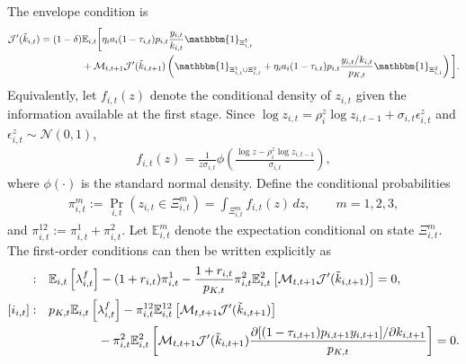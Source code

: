 \documentclass[12pt]{article}
\numberwithin{equation}{section}
\begin{document}
The envelope condition is
\begin{align*}
    \mathcal{J}'(\tilde{k}_{i,t}) = (1-\delta) &\mathbb{E}_{i,t}\bigg[\eta_i a_i (1-\tau_{i,t})p_{i,t}\frac{y_{i,t}}{k_{i,t}}\mathbbm{1}_{\Xi^1_{i,t}} \\
    &+ \mathcal{M}_{t,t+1} \mathcal{J}'(\tilde{k}_{i, t+1})\left(\mathbbm{1}_{\Xi^1_{i,t} \cup \Xi^2_{i,t}} + \eta_i a_i(1-\tau_{i,t})p_{i,t}\frac{y_{i,t}/k_{i,t}}{p_{K,t}}\mathbbm{1}_{\Xi^2_{i,t}}\right)\bigg].
\end{align*}
Equivalently, let $f_{i,t}(z)$ denote the conditional density of $z_{i,t}$ given the information available at the first stage. Since $\log z_{i,t}=\rho_i^z\log z_{i,t-1}+\sigma_{i,t}\epsilon^z_{i,t}$ and $\epsilon^z_{i,t}\sim\mathcal N(0,1)$,
\begin{align*}
    f_{i,t}(z)
    =
    \frac{1}{z\sigma_{i,t}}
    \phi\left(
        \frac{\log z-\rho_i^z\log z_{i,t-1}}{\sigma_{i,t}}
    \right),
\end{align*}
where $\phi(\cdot)$ is the standard normal density. Define the conditional probabilities
\begin{align*}
    \pi^m_{i,t}
    :=
    \Pr_{i,t}\left(z_{i,t}\in\Xi^m_{i,t}\right)
    =
    \int_{\Xi^m_{i,t}} f_{i,t}(z)\,dz,
    \qquad
    m=1,2,3,
\end{align*}
and $\pi^{12}_{i,t}:=\pi^1_{i,t}+\pi^2_{i,t}$. Let $\mathbb{E}^m_{i,t}$ denote the expectation conditional on state $\Xi^m_{i,t}$. The first-order conditions can then be written explicitly as
\begin{align}
    [b^f_{i,t}]: \quad
    &\mathbb{E}_{i,t}\left[\lambda^f_{i,t}\right]
    -
    (1+r_{i,t})\pi^1_{i,t}
    -
    \frac{1+r_{i,t}}{p_{K,t}}
    \pi^2_{i,t}
    \mathbb{E}^{2}_{i,t}\left[
        \mathcal M_{t,t+1}
        \mathcal{J}'(\tilde{k}_{i,t+1})
    \right]
    =
    0, \label{eq:first_stage_foc_b}
    \\
    [i_{i,t}]: \quad
    &p_{K,t}\mathbb{E}_{i,t}\left[\lambda^f_{i,t}\right]
    -
    \pi^{12}_{i,t}
    \mathbb{E}^{12}_{i,t}\left[
        \mathcal M_{t,t+1}
        \mathcal{J}'(\tilde{k}_{i,t+1})
    \right]\notag \\
    &\qquad \qquad -
    \pi^{2}_{i,t}
    \mathbb{E}^2_{i,t} \left[
        \mathcal{M}_{t,t+1}\mathcal{J}'(\tilde{k}_{i,t+1})
        \frac{\partial [(1-\tau_{i,t+1})p_{i,t+1} y_{i,t+1}]/\partial k_{i,t+1}
        }{
            p_{K,t}
        }
    \right] = 0. \label{eq:first_stage_foc_i}
\end{align}
\end{document}
